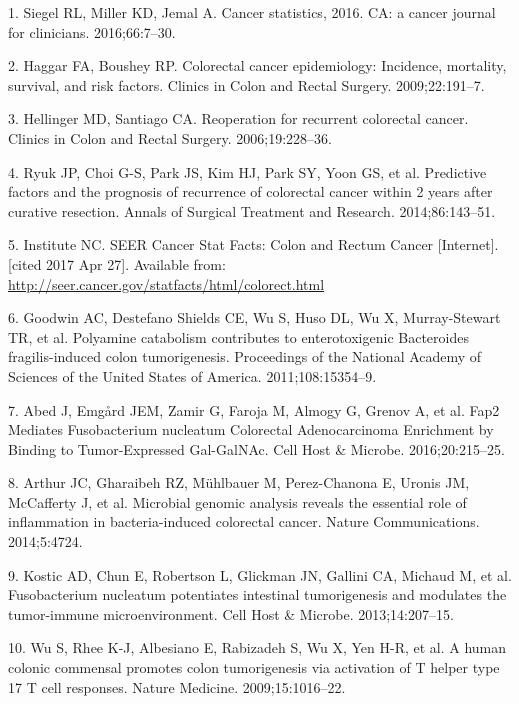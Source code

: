 \documentclass[12pt,]{article}
\begin{document}
\hypertarget{refs}{}
\hypertarget{ref-siegel_cancer_2016}{}
1. Siegel RL, Miller KD, Jemal A. Cancer statistics, 2016. CA: a cancer
journal for clinicians. 2016;66:7--30.

\hypertarget{ref-haggar_colorectal_2009}{}
2. Haggar FA, Boushey RP. Colorectal cancer epidemiology: Incidence,
mortality, survival, and risk factors. Clinics in Colon and Rectal
Surgery. 2009;22:191--7.

\hypertarget{ref-hellinger_reoperation_2006}{}
3. Hellinger MD, Santiago CA. Reoperation for recurrent colorectal
cancer. Clinics in Colon and Rectal Surgery. 2006;19:228--36.

\hypertarget{ref-ryuk_predictive_2014}{}
4. Ryuk JP, Choi G-S, Park JS, Kim HJ, Park SY, Yoon GS, et al.
Predictive factors and the prognosis of recurrence of colorectal cancer
within 2 years after curative resection. Annals of Surgical Treatment
and Research. 2014;86:143--51.

\hypertarget{ref-national_cancer_institute_seer_nodate}{}
5. Institute NC. SEER Cancer Stat Facts: Colon and Rectum Cancer
{[}Internet{]}. {[}cited 2017 Apr 27{]}. Available from:
\url{http://seer.cancer.gov/statfacts/html/colorect.html}

\hypertarget{ref-goodwin_polyamine_2011}{}
6. Goodwin AC, Destefano Shields CE, Wu S, Huso DL, Wu X, Murray-Stewart
TR, et al. Polyamine catabolism contributes to enterotoxigenic
Bacteroides fragilis-induced colon tumorigenesis. Proceedings of the
National Academy of Sciences of the United States of America.
2011;108:15354--9.

\hypertarget{ref-abed_fap2_2016}{}
7. Abed J, Emgård JEM, Zamir G, Faroja M, Almogy G, Grenov A, et al.
Fap2 Mediates Fusobacterium nucleatum Colorectal Adenocarcinoma
Enrichment by Binding to Tumor-Expressed Gal-GalNAc. Cell Host \&
Microbe. 2016;20:215--25.

\hypertarget{ref-arthur_microbial_2014}{}
8. Arthur JC, Gharaibeh RZ, Mühlbauer M, Perez-Chanona E, Uronis JM,
McCafferty J, et al. Microbial genomic analysis reveals the essential
role of inflammation in bacteria-induced colorectal cancer. Nature
Communications. 2014;5:4724.

\hypertarget{ref-kostic_fusobacterium_2013}{}
9. Kostic AD, Chun E, Robertson L, Glickman JN, Gallini CA, Michaud M,
et al. Fusobacterium nucleatum potentiates intestinal tumorigenesis and
modulates the tumor-immune microenvironment. Cell Host \& Microbe.
2013;14:207--15.

\hypertarget{ref-wu_human_2009}{}
10. Wu S, Rhee K-J, Albesiano E, Rabizadeh S, Wu X, Yen H-R, et al. A
human colonic commensal promotes colon tumorigenesis via activation of T
helper type 17 T cell responses. Nature Medicine. 2009;15:1016--22.
\end{document}
